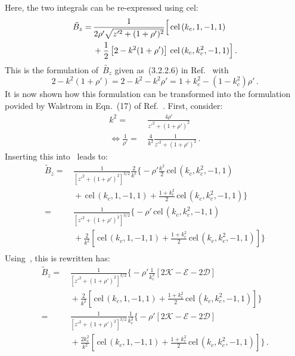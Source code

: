 Here, the two integrals can be re-expressed using cel:
\begin{align}
 \tilde{B}_z
 =&\, \frac{1}{2 \rho' \sqrt{z'^2 + (1 + \rho')^2}} \Bigl[ \,\textrm{cel}\,(k_c, 1, -1, 1) \nonumber \\
 ~&\, + \frac{1}{2} \left[2 - k^2 (1+\rho') \right] \,\textrm{cel}\,(k_c, k_c^2, -1, 1) \Bigr] \, . \label{eqn:cwl_B_z_teal}
\end{align}
This is the formulation of~$\tilde{B_z}$ given as~(3.2.2.6) in Ref.~\cite{teal} with
\begin{equation}
   2 - k^2(1 + \rho')
 = 2 - k^2 - k^2 \rho'
 = 1 + k_c^2 - (1 - k_c^2) \rho' \, .
\end{equation}
It is now shown how this formulation can be transformed into
the formulation povided by Walstrom in Eqn.~(17) of Ref.~\cite{walstrom_2017}.
First, consider:
\begin{align}
  k^2 =&\, \frac{4 \rho'}{z'^2 + (1+\rho')^2} \nonumber \\
  \Leftrightarrow
  \frac{1}{\rho'} =&\, \frac{4}{k^2} \frac{1}{z'^2 + (1+\rho')^2} \, .
\end{align}
Inserting this into~ leads to:
\begin{align}
 \tilde{B}_z
 =&\, \frac{1}{\left[z'^2 + (1 + \rho')^2\right]^{3/2}} \frac{2}{k^2} \Biggl\{
      -\rho' \frac{k^2}{2} \,\textrm{cel}\,(k_c, k_c^2, -1, 1) \nonumber \\
 ~&\, + \,\textrm{cel}\,(k_c, 1, -1, 1) + \frac{1 + k_c^2}{2} \,\textrm{cel}\,(k_c, k_c^2, -1, 1) \Biggr\} \nonumber \\
 =&\, \frac{1}{\left[z'^2 + (1 + \rho')^2\right]^{3/2}}  \Biggl\{
      -\rho' \,\textrm{cel}\,(k_c, k_c^2, -1, 1) \nonumber \\
 ~&\, + \frac{2}{k^2} \left[ \,\textrm{cel}\,(k_c, 1, -1, 1) + \frac{1 + k_c^2}{2} \,\textrm{cel}\,(k_c, k_c^2, -1, 1) \right] \Biggr\} \nonumber \\
\end{align}
Using~, this is rewritten has:
\begin{align}
 \tilde{B}_z
 =&\, \frac{1}{\left[z'^2 + (1 + \rho')^2\right]^{3/2}}  \Biggl\{
      -\rho' \frac{1}{k_c^2} \left[ 2 \mathcal{K} - \mathcal{E} - 2 \mathcal{D} \right] \nonumber \\
 ~&\, + \frac{2}{k^2} \left[ \,\textrm{cel}\,(k_c, 1, -1, 1) + \frac{1 + k_c^2}{2} \,\textrm{cel}\,(k_c, k_c^2, -1, 1) \right] \Biggr\} \label{eqn:cwl_B_z_intermediate} \\
 =&\, \frac{1}{\left[z'^2 + (1 + \rho')^2\right]^{3/2}} \frac{1}{k_c^2} \Biggl\{
      -\rho' \left[ 2 \mathcal{K} - \mathcal{E} - 2 \mathcal{D} \right] \nonumber \\
 ~&\, + \frac{2 k_c^2}{k^2} \left[ \,\textrm{cel}\,(k_c, 1, -1, 1) + \frac{1 + k_c^2}{2} \,\textrm{cel}\,(k_c, k_c^2, -1, 1) \right] \Biggr\} \, .
\end{align}
